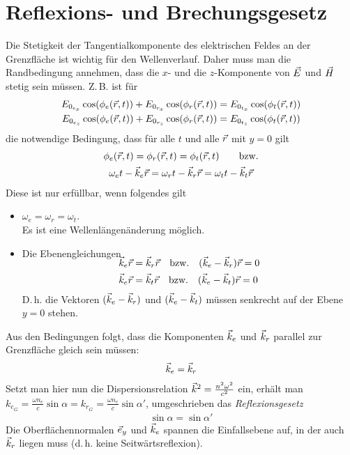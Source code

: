 
\section{Reflexions- und Brechungsgesetz}
Die Stetigkeit der Tangentialkomponente des elektrischen Feldes an der
Grenzfläche ist wichtig für den Wellenverlauf.
Daher muss man die Randbedingung annehmen, dass die $x$- und die
$z$-Komponente von $\vec{E}$ und $\vec{H}$ stetig sein müssen.
Z.\,B. ist für
\begin{align*}
  E_{0_{e_x}} \cos(\phi_e(\vec{r},t)) 
  +  E_{0_{r_x}} \cos(\phi_r(\vec{r},t)) 
  &=   E_{0_{t_x}} \cos(\phi_t(\vec{r},t)) \\
  E_{0_{e_z}} \cos(\phi_e(\vec{r},t)) 
  +  E_{0_{r_z}} \cos(\phi_r(\vec{r},t)) 
  &=   E_{0_{t_z}} \cos(\phi_t(\vec{r},t)) \\
\end{align*}
die notwendige Bedingung, dass für alle $t$ und alle $\vec{r}$
mit $y=0$ gilt
\begin{gather*}
  \phi_e(\vec{r}, t) = \phi_r(\vec{r},t) = \phi_t(\vec{r}, t) 
  \qquad\text{bzw.}\\
  \omega_et- \vec{k}_e\vec{r} = \omega_rt- \vec{k}_r\vec{r} = \omega_tt- \vec{k}_t\vec{r}
\end{gather*}
Diese ist nur erfüllbar, wenn folgendes gilt
\begin{itemize}
\item $\omega_e=\omega_r=\omega_t$.\\
   Es ist eine Wellenlängenänderung möglich.
\item Die Ebenengleichungen
  \begin{align*}
    \SwapAboveDisplaySkip  
    \veck_e\vecr &= \veck_r\vecr \quad\text{bzw.} \quad(\veck_e-\veck_r)\vecr=0\\
    \veck_e\vecr &= \veck_t\vecr \quad\text{bzw.} \quad(\veck_e-\veck_t)\vecr=0
  \end{align*}
  D.\,h. die Vektoren $(\vec{k}_e-\vec{k}_r)$
  und $(\vec{k}_e-\vec{k}_t)$ müssen senkrecht auf der Ebene $y=0$ stehen.
\end{itemize}

Aus den Bedingungen folgt, dass die Komponenten $\vec{k}_e$ und
$\vec{k}_r$ parallel zur Grenzfläche gleich sein müssen:
\begin{gather*}
  \vec{k}_e = \vec{k}_r
\end{gather*}
Setzt man hier nun die Dispersionsrelation 
$\vec{k}^2 = \frac{n^2\omega^2}{c^2}$ ein, erhält man
$k_{e_G} = \frac{\omega n_e}{c}\sin\alpha = k_{r_G} 
= \frac{\omega n_e}{c}\sin\alpha'$, umgeschrieben das
\emph{Reflexionsgesetz}
\begin{gather}
  \label{reflexionsgesetz}
  \sin\alpha = \sin\alpha'
\end{gather}
Die Oberflächennormalen $\vec{e}_y$ und $\vec{k}_e$ spannen die
Einfallsebene auf, in der auch $\vec{k}_r$ liegen muss (d.\,h. keine
Seitwärtsreflexion).

